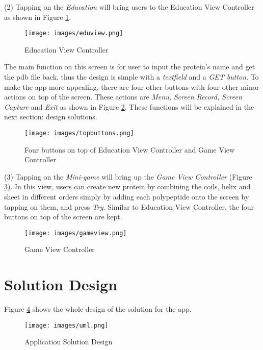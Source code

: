 (2) Tapping on the \emph{Education} will bring users to the Education View Controller as shown in Figure \ref{fig:eduview}.
\begin{figure}[!htp]
	\centering
	\texttt{[image: images/eduview.png]}
	\caption{Education View Controller}
	\label{fig:eduview}
\end{figure}
The main function on this screen is for user to input the protein’s name and get the pdb file back, thus the design is simple with a \emph{textfield} and a \emph{GET button}. To make the app more appealing, there are four other buttons with four other minor actions on top of the screen. These actions are \emph{Menu, Screen Record, Screen Capture} and \emph{Exit} as shown in Figure \ref{fig:topbuttons}. These functions will be explained in the next section: design solutions.   
\begin{figure}[!htp]
	\centering
	\texttt{[image: images/topbuttons.png]}
	\caption{Four buttons on top of Education View Controller and Game View Controller}
	\label{fig:topbuttons}
\end{figure}

(3) Tapping on the \emph{Mini-game} will bring up the \emph{Game View Controller} (Figure \ref{fig:gameview}).
In this view, users can create new protein by combining the coils, helix and sheet in different orders simply by adding each polypeptide onto the screen by tapping on them, and press \emph{Try}. Similar to Education View Controller, the four buttons on top of the screen are kept. 
\begin{figure}[!htp]
	\centering
	\texttt{[image: images/gameview.png]}
	\caption{Game View Controller}
	\label{fig:gameview}
\end{figure}


\section{Solution Design}
Figure \ref{fig:uml} shows the whole design of the solution for the app. 
\begin{figure}[!htp]
	\centering
	\texttt{[image: images/uml.png]}
	\caption{Application Solution Design}
	\label{fig:uml}
\end{figure}

